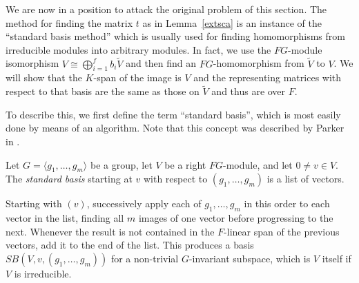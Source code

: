 \bigskip
We are now in a position to attack the original problem of this
section. The method for finding the matrix $t$ as in Lemma~\ref{extsca}
is an instance of the 
``standard basis method'' which is usually used for finding
homomorphisms from irreducible modules into arbitrary modules. In fact, we
use the $FG$-module isomorphism $V \cong 
\bigoplus_{i=1}^f b_i\tilde{V}$ 
and then find an $FG$-homomorphism
from $\tilde{V}$ to $V$. We will show that the $K$-span of the image is $V$
and the representing matrices with respect to that basis
are the same as those on $\tilde{V}$ and thus are over $F$.

To describe this, we first define the term ``standard basis'', which
is most easily done by means of an algorithm. Note that this concept was
described by Parker in \cite[Section~6]{MeatAxeRP}.

\begin{Def} \label{spinup}
%
Let $G = \langle g_1, \ldots, g_m \rangle$ be a group, 
let $V$ be a right $FG$-module,
and let $0 \neq v \in V$. The \emph{standard basis} starting at $v$ with
respect to $(g_1,\ldots,g_m)$  is a
list of vectors.

Starting with $(v)$, successively apply each of $g_1, \ldots, g_m$
in this order to each vector in the list, 
finding all $m$ images of one vector before progressing to the next.  
 Whenever the result
is not contained in the $F$-linear span of  the previous vectors, 
add it to the end of the list. This produces
 a basis $SB(V,v,(g_1, \ldots, g_m))$ for a 
non-trivial $G$-invariant subspace, which 
is $V$ itself  if $V$ is irreducible.

\end{Def}



